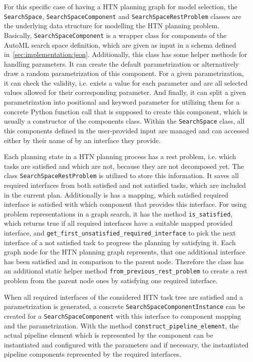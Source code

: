 For this specific case of having a HTN planning graph for model selection, the \texttt{SearchSpace}, \texttt{SearchSpaceComponent} and \texttt{SearchSpaceRestProblem} classes are the underlying data structure for modelling the HTN planning problem.\newline
Basically, \texttt{SearchSpaceComponent} is a wrapper class for components of the AutoML search space definition, which are given as input in a schema defined in~\ref{sec:implementation:json}.
Additionally, this class has some helper methods for handling parameters.
It can create the default parametrization or alternatively draw a random parametrization of this component.
For a given parametrization, it can check the validity, i.e. exists a value for each parameter and are all selected values allowed for their corresponding parameter.
And finally, it can split a given parametrization into positional and keyword parameter for utilizing them for a concrete Python function call that is supposed to create this component, which is usually a constructor of the components class.\newline
Within the \texttt{SearchSpace} class, all this components defined in the user-provided input are managed and can accessed either by their name of by an interface they provide.

Each planning state in a HTN planning process has a rest problem, i.e. which tasks are satisfied and which are not, because they are not decomposed yet.
The class \texttt{SearchSpaceRestProblem} is utilized to store this information.
It saves all required interfaces from both satisfied and not satisfied tasks, which are included in the current plan.
Additionally is has a mapping, which satisfied required interface is satisfied with which component that provides this interface.\newline
For using problem representations in a graph search, it has the method \texttt{is\_satisfied}, which returns true if all required interfaces have a suitable mapped provided interface, and \texttt{get\_first\_unsatisfied\_required\_interface} to pick the next interface of a not satisfied task to progress the planning by satisfying it.
Each graph node for the HTN planning graph represents, that one additional interface has been satisfied and in comparison to the parent node.
Therefore the class has an additional static helper method \texttt{from\_previous\_rest\_problem} to create a rest problem from the parent node ones by satisfying one required interface.

When all required interfaces of the considered HTN task tree are satisfied and a parametrization is generated, a concrete \texttt{SearchSpaceComponentInstance} can be created for a \texttt{SearchSpaceComponent} with this interface to component mapping and the parametrization.
With the method \texttt{construct\_pipeline\_element}, the actual pipeline element which is represented by the component can be instantiated and configured with the parameters and if necessary, the instantiated pipeline components represented by the required interfaces.

